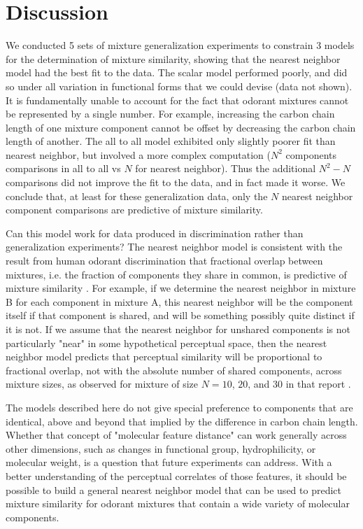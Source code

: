 \section{Discussion}
\label{sec:discussion}
We conducted 5 sets of mixture generalization experiments to constrain 3 models for the determination of mixture similarity, showing that the nearest neighbor model had the best fit to the data.  
The scalar model performed poorly, and did so under all variation in functional forms that we could devise (data not shown).  
It is fundamentally unable to account for the fact that odorant mixtures cannot be represented by a single number. 
For example, increasing the carbon chain length of one mixture component cannot be offset by decreasing the carbon chain length of another. 
The all to all model exhibited only slightly poorer fit than nearest neighbor, but involved a more complex computation ($N^2$ components comparisons in all to all vs $N$ for nearest neighbor).  
Thus the additional $N^2 - N$ comparisons did not improve the fit to the data, and in fact made it worse.  
We conclude that, at least for these generalization data, only the $N$ nearest neighbor component comparisons are predictive of mixture similarity.  

Can this model work for data produced in discrimination rather than generalization experiments?  
The nearest neighbor model is consistent with the result from human odorant discrimination that fractional overlap between mixtures, i.e. the fraction of components they share in common, is predictive of mixture similarity \cite{24653035}.  
For example, if we determine the nearest neighbor in mixture B for each component in mixture A, this nearest neighbor will be the component itself if that component is shared, and will be something possibly quite distinct if it is not.  If we assume that the nearest neighbor for unshared components is not particularly "near" in some hypothetical perceptual space, then the nearest neighbor model predicts that perceptual similarity will be proportional to fractional overlap, not with the absolute number of shared components, across mixture sizes, as observed for mixture of size $N=10$, $20$, and $30$ in that report \cite{24653035}.

The models described here do not give special preference to components that are identical, above and beyond that implied by the difference in carbon chain length.  Whether that concept of "molecular feature distance" can work generally across other dimensions, such as changes in functional group, hydrophilicity, or molecular weight, is a question that future experiments can address.  
With a better understanding of the perceptual correlates of those features, it should be possible to build a general nearest neighbor model that can be used to predict mixture similarity for odorant mixtures that contain a wide variety of molecular components.  